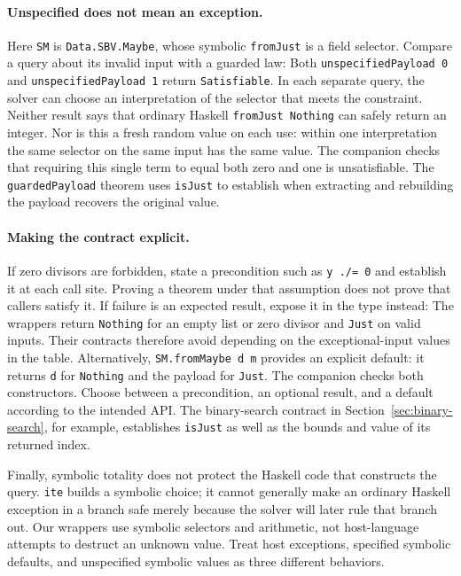 \documentclass[review]{jfp-epi}
\newcommand{\code}[1]{\texttt{#1}}
\begin{document}
\paragraph{Unspecified does not mean an exception.}
Here \code{SM} is \code{Data.SBV.Maybe}, whose symbolic \code{fromJust} is a
field selector. Compare a query about its invalid input with a guarded law:
Both \code{unspecifiedPayload 0} and \code{unspecifiedPayload 1} return
\code{Satisfiable}. In each separate query, the solver can choose an
interpretation of the selector that meets the constraint. Neither result says
that ordinary Haskell \code{fromJust Nothing} can safely return an integer.
Nor is this a fresh random value on each use: within one interpretation the
same selector on the same input has the same value. The companion checks that
requiring this single term to equal both zero and one is unsatisfiable.
The \code{guardedPayload} theorem uses \code{isJust} to establish when extracting
and rebuilding the payload recovers the original value.

\paragraph{Making the contract explicit.}
If zero divisors are forbidden, state a precondition such as \code{y ./= 0}
and establish it at each call site. Proving a theorem under that assumption
does not prove that callers satisfy it. If failure is an expected result,
expose it in the type instead:
The wrappers return \code{Nothing} for an empty list or zero divisor and
\code{Just} on valid inputs. Their contracts therefore avoid depending on the
exceptional-input values in the table. Alternatively, \code{SM.fromMaybe d m}
provides an explicit default: it returns \code{d} for \code{Nothing} and the
payload for \code{Just}. The companion checks both constructors. Choose between
a precondition, an optional result, and a default according to the intended API.
The binary-search contract in Section~\ref{sec:binary-search}, for example,
establishes \code{isJust} as well as the bounds and value of its returned index.

Finally, symbolic totality does not protect the Haskell code that constructs
the query. \code{ite} builds a symbolic choice; it cannot generally make an
ordinary Haskell exception in a branch safe merely because the solver will
later rule that branch out. Our wrappers use symbolic selectors and arithmetic,
not host-language attempts to destruct an unknown value. Treat host exceptions,
specified symbolic defaults, and unspecified symbolic values as three different
behaviors.
\end{document}
